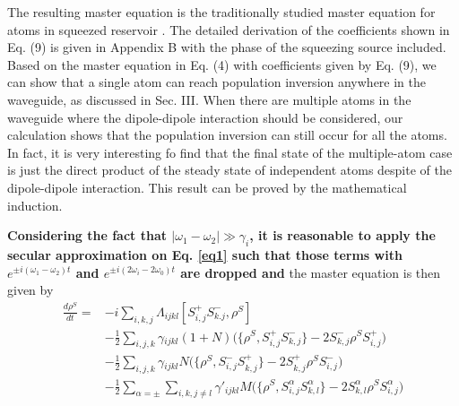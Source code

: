 \documentclass[aps,showpacs,twocolumn,twoside,groupedaddress]{revtex4}
\begin{document}
The resulting master equation is the traditionally studied master equation for atoms in squeezed reservoir  \cite{tanas2004stationary}. The detailed derivation of the coefficients shown in Eq. (9) is given in Appendix B with the phase of the squeezing source included. Based on the master equation in Eq. (4) with coefficients given by Eq. (9), we can show that a single atom can reach population inversion anywhere in the waveguide, as discussed in Sec. III. When there are multiple atoms in the waveguide where the dipole-dipole interaction should be considered, our calculation shows that the population inversion can still occur for all the atoms. In fact, it is very interesting fo find that the final state of the multiple-atom case is just the direct product of the steady state of independent atoms despite of the dipole-dipole interaction.  This result can be proved by the mathematical induction. 

\textbf{Considering the fact that $|\omega_1-\omega_2|\gg \gamma_i$, it is reasonable to apply the secular approximation on Eq. \eqref{eq1} such that those terms with $e^{\pm i(\omega_1-\omega_2)t}$ and $e^{\pm i(2\omega_i-2\omega_0)t}$ are dropped and} the master equation is then given by 
\begin{equation}
\label{eq5}
\begin{split}
\frac{d\rho^{S}}{dt}=&-i\underset{i,k,j}{\sum}\Lambda_{ijkl}[S_{i,j}^{+}S_{k.j}^{-},\rho^{S}] \\ &-\frac{1}{2}\underset{i,j,k}{\sum}\gamma{}_{ijkl}(1+N)\Big(\{\rho^{S},S_{i,j}^{+}S_{k,j}^{-}\}-2S_{k,j}^{-}\rho^{S}S_{i,j}^{+}\Big) \\
& -\frac{1}{2}\underset{i,j,k}{\sum}\gamma{}_{ijkl}N\Big(\{\rho^{S},S_{i,j}^{-}S_{k,j}^{+}\}-2S_{k,j}^{+}\rho^{S}S_{i,j}^{-}\Big)\\
& -\frac{1}{2}\sum_{\alpha=\pm}\underset{i,k,j\ne l}{\sum}\gamma'_{ijkl}M\Big(\{\rho^{S},S_{i,j}^{\alpha}S_{k,l}^{\alpha}\}-2S_{k,l}^{\alpha}\rho^{S}S_{i,j}^{\alpha}\Big)
\end{split}
\end{equation}
\end{document}
